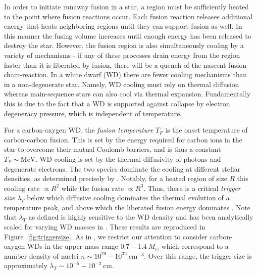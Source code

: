 \documentclass[twocolumn,showpacs,preprintnumbers,amsmath,amssymb,prl]{revtex4}
\newcommand{\MeV}{\text{MeV}}
\newcommand{\cm}{\text{cm}}
\begin{document}
In order to initiate runaway fusion in a star, a region must be sufficiently heated to the point where fusion reactions occur.  Each fusion reaction releases additional energy that heats neighboring regions until they can support fusion as well. In this manner the fusing volume increases until enough energy has been released to destroy the star.  However, the fusion region is also simultaneously cooling by a variety of mechanisms - if any of these processes drain energy from the region faster than it is liberated by fusion, there will be a quench of the nascent fusion chain-reaction. In a white dwarf (WD) there are fewer cooling mechanisms than in a non-degenerate star. Namely, WD cooling must rely on thermal diffusion whereas main-sequence stars can also cool via thermal expansion. Fundamentally this is due to the fact that a WD is supported against collapse by electron degeneracy pressure, which is independent of temperature. 

For a carbon-oxygen WD, the \emph{fusion temperature} $T_F$ is the onset temperature of carbon-carbon fusion. This is set by the energy required for carbon ions in the star to overcome their mutual Coulomb barriers, and is thus a constant $T_F \sim \MeV$. WD cooling is set by the thermal diffusivity of photons and degenerate electrons. The two species dominate the cooling at different stellar densities, as determined precisely by \cite{Woosley}. Notably, for a heated region of size $R$ this cooling rate $\propto R^2$ while the fusion rate $\propto R^3$. Thus, there is a critical \emph{trigger size} $\lambda_T$ below which diffusive cooling dominates the thermal evolution of a temperature peak, and above which the liberated fusion energy dominates \cite{Woosley}. Note that $\lambda_T$ as defined is highly sensitive to the WD density and has been analytically scaled for varying WD masses in \cite{Graham:2015apa}. These results are reproduced in Figure~\ref{fig:triggersize}. As in \cite{Graham:2015apa}, we restrict our attention to consider carbon-oxygen WDs in the upper mass range $0.7 - 1.4 ~M_{\odot}$ which correspond to a number density of nuclei $n \sim 10^{29} - 10^{32} ~\cm^{-3}$. Over this range, the trigger size is approximately $\lambda_T \sim 10^{-5} - 10^{-2} ~\text{cm}$. 
\end{document}
